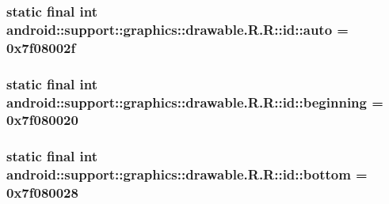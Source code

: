 \hypertarget{classandroid_1_1support_1_1graphics_1_1drawable_1_1_r_1_1id_df9e929374b7656bcd1cd1b8ede30610}{
\subsubsection[{auto}]{\setlength{\rightskip}{0pt plus 5cm}static final int android::support::graphics::drawable.R.R::id::auto = 0x7f08002f}}
\label{classandroid_1_1support_1_1graphics_1_1drawable_1_1_r_1_1id_df9e929374b7656bcd1cd1b8ede30610}


\hypertarget{classandroid_1_1support_1_1graphics_1_1drawable_1_1_r_1_1id_1a87c1334e2c8ca155468335d2731a10}{
\subsubsection[{beginning}]{\setlength{\rightskip}{0pt plus 5cm}static final int android::support::graphics::drawable.R.R::id::beginning = 0x7f080020}}
\label{classandroid_1_1support_1_1graphics_1_1drawable_1_1_r_1_1id_1a87c1334e2c8ca155468335d2731a10}


\hypertarget{classandroid_1_1support_1_1graphics_1_1drawable_1_1_r_1_1id_a2ea37c395f186a12b8b8b27012ec047}{
\subsubsection[{bottom}]{\setlength{\rightskip}{0pt plus 5cm}static final int android::support::graphics::drawable.R.R::id::bottom = 0x7f080028}}
\label{classandroid_1_1support_1_1graphics_1_1drawable_1_1_r_1_1id_a2ea37c395f186a12b8b8b27012ec047}


